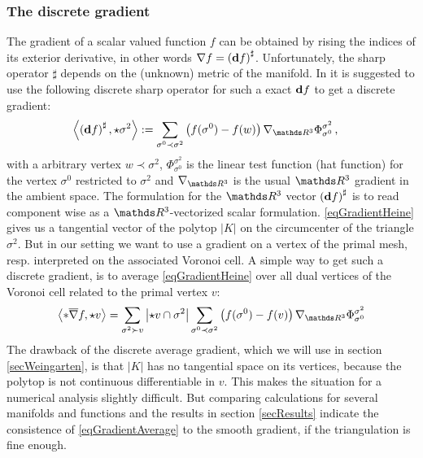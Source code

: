     \subsubsection{The discrete gradient}
      The gradient of a scalar valued function \( f \) can be obtained by rising the indices of its exterior derivative, 
      in other words \( \nabla f = \left( \mathbf{d} f \right)^{\sharp} \).
      Unfortunately, the sharp operator \( \sharp \) depends on the (unknown) metric of the manifold. 
      In \cite{hirani} it is suggested to use the following discrete sharp operator for such a exact  \( \mathbf{d} f \) to get a discrete
      gradient:
      \begin{align}
        \label{eqGradientHeine}
        \left\langle \left( \exd f \right)^{\sharp} , \star\sigma^{2}\right\rangle
          &:= \sum_{\sigma^{0}\prec\sigma^{2}} \left( f(\sigma^{0}) - f(w) \right) \nabla_{\R^{3}}\Phi_{\sigma^{0}}^{\sigma^{2}} \formkomma
      \end{align}
      with a arbitrary vertex \( w\prec\sigma^{2} \),
      \( \Phi_{\sigma^{0}}^{\sigma^{2}} \) is the linear test function (hat function) for the vertex \( \sigma^{0} \) 
      restricted to \( \sigma^{2} \) and \( \nabla_{\R^{3}} \) is the usual \( \R^{3} \) gradient in the ambient space. 
      The formulation for the \( \R^{3} \) vector \( \left( \mathbf{d} f \right)^{\sharp} \) is to read component wise 
      as a \( \R^{3} \)-vectorized scalar formulation.
      \eqref{eqGradientHeine} gives us a tangential vector of the polytop \( |K| \) on the circumcenter of the triangle \( \sigma^{2} \).
      But in our setting we want to use a gradient on a vertex of the primal mesh, resp. interpreted on the associated Voronoi cell.
      A simple way to get such a discrete gradient, is to average \eqref{eqGradientHeine} over all dual vertices of the Voronoi cell
      related to the primal vertex \( v \):
      \begin{align} \label{eqGradientAverage}
        \left\langle *\overline\nabla f, \star v \right\rangle
            = \sum_{\sigma^{2}\succ v} \left| \star v \cap \sigma^{2} \right|
                 \sum_{\sigma^{0}\prec\sigma^{2}} \left( f(\sigma^{0}) - f(v) \right) \nabla_{\R^{3}}\Phi_{\sigma^{0}}^{\sigma^{2}}
      \end{align}
      The drawback of the discrete average gradient, which we will use in section \ref{secWeingarten}, is that \( |K| \) has no tangential
      space on its vertices, because the polytop is not continuous differentiable in \( v \).
      This makes the situation for a numerical analysis slightly difficult.
      But comparing calculations for several manifolds and functions and 
      the results in section \ref{secResults} indicate the consistence of \eqref{eqGradientAverage} to the smooth
      gradient, 
      if the triangulation is fine enough. 
      
